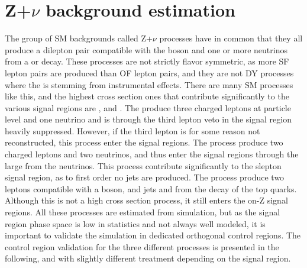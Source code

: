 \section{Z+$\nu$ background estimation}\label{sec:Znu}
\noindent\justify
The group of SM backgrounds called Z+$\nu$ processes have in common that they all produce a dilepton pair compatible with the \PZ boson and one or more neutrinos from a \PZ or \PW decay. 
These processes are not strictly flavor symmetric, as more SF lepton pairs are produced than OF lepton pairs, and they are not DY processes where the \ptmiss is stemming from instrumental effects. 
There are many SM processes like this, and the highest cross section ones that contribute significantly to the various signal regions are \PWZ, \PZZ and \ttZ. 
The \PWZ produce three charged leptons at particle level and one neutrino and is through the third lepton veto in the signal region heavily suppressed. 
However, if the third lepton is for some reason not reconstructed, this process enter the signal regions.  
The \PZZ process produce two charged leptons and two neutrinos, and thus enter the signal regions through the large \ptmiss from the neutrinos. 
This process contribute significantly to the slepton signal region, as to first order no jets are produced. 
The \ttZ process produce two leptons compatible with a \PZ boson, and jets and \ptmiss from the decay of the top quarks. 
Although this is not a high cross section process, it still enters the on-Z signal regions. 
All these processes are estimated from simulation, but as the signal region phase space is low in statistics and not always well modeled, it is important to validate the simulation in dedicated orthogonal control regions. 
The control region validation for the three different processes is presented in the following, and with slightly different treatment depending on the signal region.  
